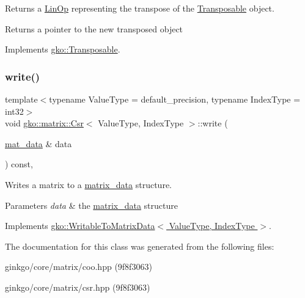 Returns a \hyperlink{classgko_1_1LinOp}{Lin\+Op} representing the transpose of the \hyperlink{classgko_1_1Transposable}{Transposable} object. 

\begin{DoxyReturn}{Returns}
a pointer to the new transposed object 
\end{DoxyReturn}


Implements \hyperlink{classgko_1_1Transposable_a5c6b778b71b47d53e0bda6ccf894d318}{gko\+::\+Transposable}.

\mbox{\label{classgko_1_1matrix_1_1Csr_a205fc391f4cf4f7718a55b0a61f62bc9}} 
\subsubsection{\texorpdfstring{write()}{write()}}
{\footnotesize\ttfamily template$<$typename Value\+Type = default\+\_\+precision, typename Index\+Type = int32$>$ \\
void \hyperlink{classgko_1_1matrix_1_1Csr}{gko\+::matrix\+::\+Csr}$<$ Value\+Type, Index\+Type $>$\+::write (\begin{DoxyParamCaption}\item[{\hyperlink{structgko_1_1matrix__data}{mat\+\_\+data} \&}]{data }\end{DoxyParamCaption}) const\hspace{0.3cm}{\ttfamily [override]}, {\ttfamily [virtual]}}



Writes a matrix to a \hyperlink{structgko_1_1matrix__data}{matrix\+\_\+data} structure. 


\begin{DoxyParams}{Parameters}
{\em data} & the \hyperlink{structgko_1_1matrix__data}{matrix\+\_\+data} structure \\
\hline
\end{DoxyParams}


Implements \hyperlink{classgko_1_1WritableToMatrixData_a96036c3a4bf4c67fa93002808b8b14e2}{gko\+::\+Writable\+To\+Matrix\+Data$<$ Value\+Type, Index\+Type $>$}.



The documentation for this class was generated from the following files\+:\begin{DoxyCompactItemize}
\item 
ginkgo/core/matrix/coo.\+hpp (9f8f3063)\item 
ginkgo/core/matrix/csr.\+hpp (9f8f3063)\end{DoxyCompactItemize}
